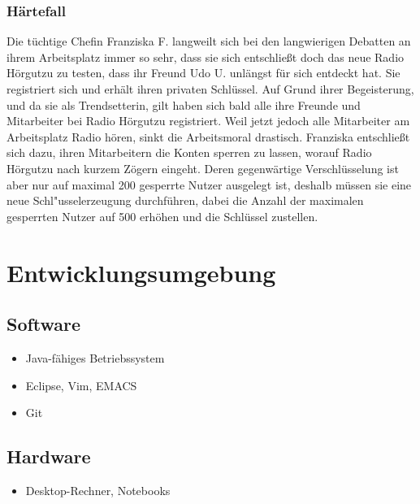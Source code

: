 \documentclass[a4paper,10pt]{scrartcl}
\begin{document}
\subsubsection{Härtefall}
Die tüchtige Chefin Franziska F. langweilt sich bei den langwierigen
Debatten an ihrem Arbeitsplatz immer so sehr, dass sie sich entschließt doch
das neue Radio Hörgutzu zu testen, dass ihr Freund Udo U. unlängst für sich entdeckt hat.
Sie registriert sich und erhält ihren privaten Schlüssel.
Auf Grund ihrer Begeisterung, und da sie als Trendsetterin, gilt haben sich bald alle ihre Freunde
und Mitarbeiter bei Radio Hörgutzu registriert. Weil jetzt jedoch alle Mitarbeiter am Arbeitsplatz
Radio hören, sinkt die Arbeitsmoral drastisch. Franziska entschließt sich dazu, ihren Mitarbeitern
die Konten sperren zu lassen, worauf Radio Hörgutzu nach kurzem Zögern eingeht. Deren
gegenwärtige Verschlüsselung ist aber nur auf maximal 200 gesperrte
Nutzer ausgelegt ist, deshalb müssen sie eine neue Schl"usselerzeugung durchführen,
dabei die Anzahl der maximalen gesperrten Nutzer auf 500 erhöhen und die Schlüssel zustellen.

\section{Entwicklungsumgebung}

\subsection{Software}
\begin{itemize}
\item Java-fähiges Betriebssystem
\item Eclipse, Vim, EMACS
\item Git
\end{itemize}
\subsection{Hardware}
\begin{itemize}
\item Desktop-Rechner, Notebooks
\end{itemize}
\clearpage




{}

\end{document}
